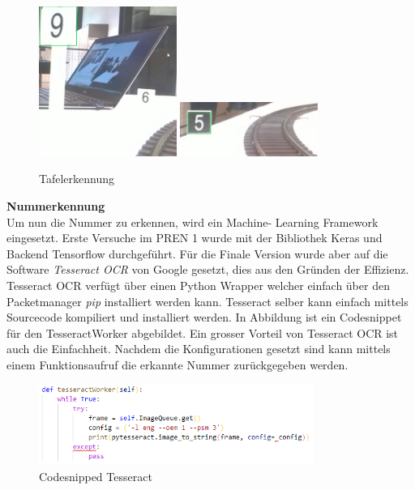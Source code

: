 \documentclass[../../main.tex]{subfiles}
\begin{document}
\vspace{0.5cm}

\begin{figure}[H] %
  \centering
  \includegraphics[width=0.4\textwidth]{tafel-weiss.png}
  \includegraphics[width=0.4\textwidth]{tafel-schwarz.png}
  \caption{Tafelerkennung}
  \label{fig:tafelerkennung}
\end{figure}

\vspace{0.5cm}

\textbf{Nummerkennung}\\
Um nun die Nummer zu erkennen, wird ein Machine- Learning Framework eingesetzt. Erste Versuche im PREN 1 wurde mit der Bibliothek Keras und Backend Tensorflow durchgeführt. Für die Finale Version wurde aber auf die Software \textit{Tesseract OCR} von Google gesetzt, dies aus den Gründen der Effizienz. Tesseract OCR verfügt über einen Python Wrapper welcher einfach über den Packetmanager \textit{pip} installiert werden kann. Tesseract selber kann einfach mittels Sourcecode kompiliert und installiert werden. In Abbildung ist ein Codesnippet für den TesseractWorker abgebildet. Ein grosser Vorteil von Tesseract OCR ist auch die Einfachheit. Nachdem die Konfigurationen gesetzt sind kann mittels einem Funktionsaufruf die erkannte Nummer zurückgegeben werden.

\begin{figure}[H] %
  \centering
  \includegraphics[width=0.8\textwidth]{codesnipped-tesseract.png}
  \caption{Codesnipped Tesseract}
  \label{fig:codesnipped_tesseract}
\end{figure}
\end{document}
